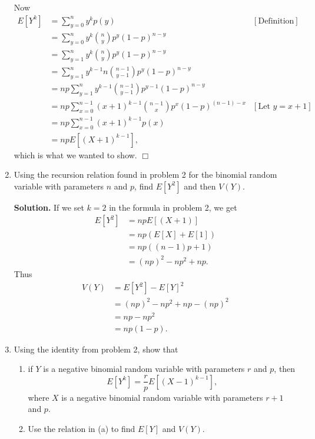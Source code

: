 \documentclass[9pt]{article}
\newcommand{\qed}{\hfill \ensuremath{\Box}}
\begin{document}
\begin{enumerate}
      Now
      \begin{align*}
         E[Y^k] &= \sum_{y=0}^ny^kp(y) &[\text{Definition}] \\
                &= \sum_{y=0}^ny^k\binom{n}{y}p^y(1 - p)^{n - y} \\
                &= \sum_{y=1}^ny^k\binom{n}{y}p^y(1 - p)^{n - y} \\
                &= \sum_{y=1}^ny^{k-1}n\binom{n - 1}{y - 1}p^y(1 - p)^{n - y} \\
                &= np\sum_{y=1}^ny^{k-1}\binom{n - 1}{y - 1}
                   p^{y-1}(1 - p)^{n - y} \\
                &= np\sum_{x=0}^{n-1}(x + 1)^{k-1}\binom{n - 1}{x}
                   p^{x}(1 - p)^{(n - 1)-x} &[\text{Let }y = x + 1] \\
                &= np\sum_{x=0}^{n-1}(x + 1)^{k-1}p(x) \\
                &= npE[(X + 1)^{k-1}],
      \end{align*}
      which is what we wanted to show. \qed
   \item Using the recursion relation found in problem 2 for the binomial random
         variable with parameters $n$ and $p$, find $E[Y^2]$ and then $V(Y)$.

      \textbf{Solution.} If we set $k = 2$ in the formula in problem 2, we get
      \begin{align*}
         E[Y^2] &= npE[(X + 1)] \\
                &= np(E[X] + E[1]) \\
                &= np((n-1)p + 1) \\
                &= (np)^2 - np^2 + np.
      \end{align*}
      Thus
      \begin{align*}
         V(Y) &= E[Y^2] - E[Y]^2 \\
              &= (np)^2 - np^2 + np - (np)^2 \\
              &= np - np^2 \\
              &= np(1 - p).
      \end{align*}
   \item Using the identity from problem 2, show that
         \begin{enumerate}
            \item if $Y$ is a negative binomial random variable with parameters
                  $r$ and $p$, then
                  $$E[Y^k] = \frac{r}{p}E[(X-1)^{k-1}],$$
                  where $X$ is a negative binomial random variable with 
                  parameters $r + 1$ and $p$.
            \item Use the relation in (a) to find $E[Y]$ and $V(Y)$.
         \end{enumerate}


\end{enumerate}
\end{document}
